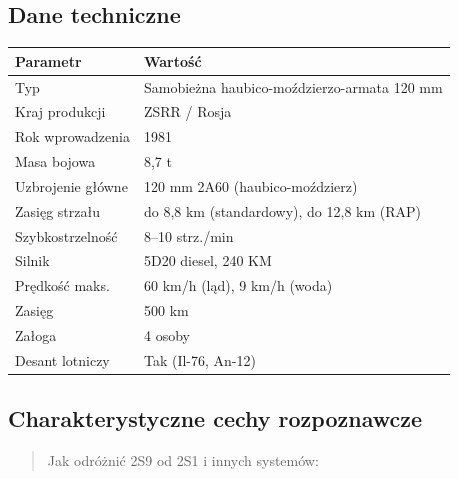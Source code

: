 \documentclass[12pt,oneside]{book}
\begin{document}
\subsection{Dane techniczne}\label{dane-techniczne-22}

\begin{longtable}[]{@{}ll@{}}
\toprule\noalign{}
Parametr & Wartość \\
\midrule\noalign{}
\endhead
\bottomrule\noalign{}
\endlastfoot
Typ & Samobieżna haubico-moździerzo-armata 120 mm \\
Kraj produkcji & ZSRR / Rosja \\
Rok wprowadzenia & 1981 \\
Masa bojowa & 8,7 t \\
Uzbrojenie główne & 120 mm 2A60 (haubico-moździerz) \\
Zasięg strzału & do 8,8 km (standardowy), do 12,8 km (RAP) \\
Szybkostrzelność & 8--10 strz./min \\
Silnik & 5D20 diesel, 240 KM \\
Prędkość maks. & 60 km/h (ląd), 9 km/h (woda) \\
Zasięg & 500 km \\
Załoga & 4 osoby \\
Desant lotniczy & Tak (Il-76, An-12) \\
\end{longtable}

\subsection{Charakterystyczne cechy
rozpoznawcze}\label{charakterystyczne-cechy-rozpoznawcze-22}

\begin{quote}
Jak odróżnić 2S9 od 2S1 i innych systemów:
\end{quote}
\end{document}
